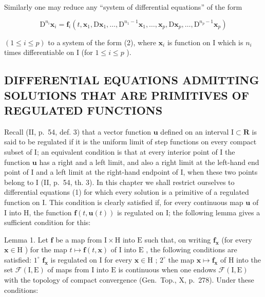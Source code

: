 Similarly one may reduce any ``system of differential equations'' of the form

\[
\mathrm{D} ^ {n _ {i}} \mathbf {x} _ {i} = \mathbf {f} _ {i} (t, \mathbf {x} _ {1}, \mathrm{D} \mathbf {x} _ {1}, \dots , \mathrm{D} ^ {n _ {1} - 1} \mathbf {x} _ {1}, \dots , \mathbf {x} _ {p}, \mathrm{D} \mathbf {x} _ {p}, \dots , \mathrm{D} ^ {n _ {p} - 1} \mathbf {x} _ {p})\tag{5}
\]

\((1 \leqslant i \leqslant p)\) to a system of the form (2), where \(\mathbf{x}_i\) is function on I which is \(n_i\) times differentiable on I (for \(1 \leqslant i \leqslant p\) ).

\subsection{DIFFERENTIAL EQUATIONS ADMITTING SOLUTIONS THAT ARE PRIMITIVES OF REGULATED FUNCTIONS}

Recall (II, p.~54, def. 3) that a vector function \(\mathbf{u}\) defined on an interval \(\mathrm{I} \subset \mathbf{R}\) is said to be regulated if it is the uniform limit of step functions on every compact subset of I; an equivalent condition is that at every interior point of I the function \(\mathbf{u}\) has a right and a left limit, and also a right limit at the left-hand end point of I and a left limit at the right-hand endpoint of I, when these two points belong to I (II, p.~54, th. 3). In this chapter we shall restrict ourselves to differential equations (1) for which every solution is a primitive of a regulated function on I. This condition is clearly satisfied if, for every continuous map \(\mathbf{u}\) of I into H, the function \(\mathbf{f}(t, \mathbf{u}(t))\) is regulated on I; the following lemma gives a sufficient condition for this:

Lemma 1. Let \(\mathbf{f}\) be a map from \(\mathrm{I} \times \mathrm{H}\) into \(\mathrm{E}\) such that, on writing \(\mathbf{f}_{\mathbf{x}}\) (for every \(\mathbf{x} \in \mathrm{H}\) ) for the map \(t \mapsto \mathbf{f}(t, \mathbf{x})\) of \(\mathrm{I}\) into \(\mathrm{E}\) , the following conditions are satisfied: \(1^{\circ}\) \(\mathbf{f}_{\mathbf{x}}\) is regulated on \(\mathrm{I}\) for every \(\mathbf{x} \in \mathrm{H}\) ; \(2^{\circ}\) the map \(\mathbf{x} \mapsto \mathbf{f}_{\mathbf{x}}\) of \(\mathrm{H}\) into the set \(\mathcal{F}(\mathrm{I}, \mathrm{E})\) of maps from \(\mathrm{I}\) into \(\mathrm{E}\) is continuous when one endows \(\mathcal{F}(\mathrm{I}, \mathrm{E})\) with the topology of compact convergence (Gen.~Top., X, p.~278). Under these conditions:

